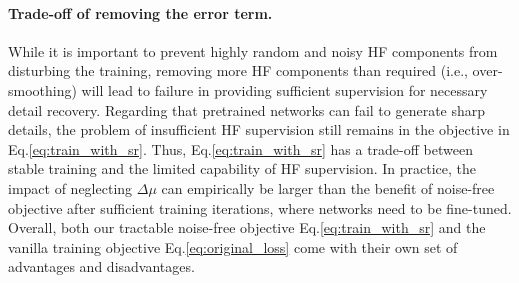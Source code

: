 \documentclass[letterpaper]{article} %
\begin{document}
\paragraph{Trade-off of removing the error term.}
\label{section:trade-off of approximated noise-free objective}
While it is important to prevent highly random and noisy HF components from disturbing the training, removing more HF components than required (i.e., over-smoothing) will lead to failure in providing sufficient supervision for necessary detail recovery. 
%
Regarding that pretrained networks can fail to generate sharp details, the problem of insufficient HF supervision still remains in the objective in Eq.\eqref{eq:train_with_sr}.
%
Thus, Eq.\eqref{eq:train_with_sr} has a trade-off between stable training and the limited capability of HF supervision. In practice, the impact of neglecting $\Delta\mu$ can empirically be larger than the benefit of noise-free objective after sufficient training iterations, where networks need to be fine-tuned. Overall, both our tractable noise-free objective Eq.\eqref{eq:train_with_sr} and the vanilla training objective Eq.\eqref{eq:original_loss} come with their own set of advantages and disadvantages. 

\end{document}
